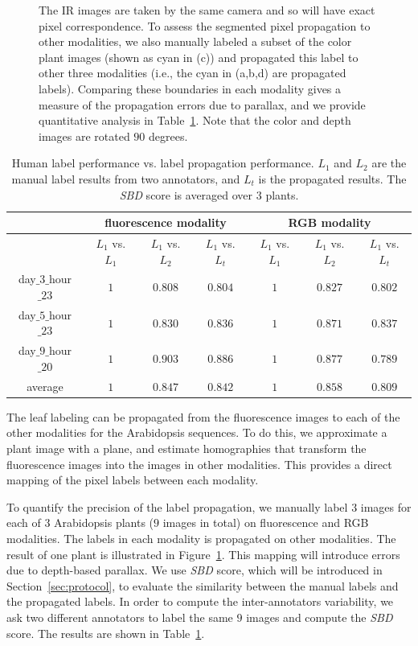 \begin{figure}[t]
\begin{centering}
{The IR images are taken by the same camera and so will have exact pixel correspondence.
To assess the segmented pixel propagation to other modalities, we also manually labeled a subset of the color plant images (shown as cyan in (c)) and propagated this label to other three modalities (i.e., the cyan in (a,b,d) are propagated labels).
Comparing these boundaries in each modality gives a measure of the propagation errors due to parallax, and we provide quantitative analysis in Table~\ref{tab:labelError}.
Note that the color and depth images are rotated $90$ degrees.}
\label{fig:LabelAlignment}
\end{centering}
\end{figure}


\begin{table}[t]
\centering
\caption{Human label performance vs. label propagation performance.
$L_1$ and $L_2$ are the manual label results from two annotators, and $L_t$ is the propagated results.
The {\it{SBD}} score is averaged over $3$ plants.}
\begin{tabular}{c|c|c|c|c|c|c}
\hline
    & \multicolumn{3}{c|}{fluorescence modality} & \multicolumn{3}{c}{RGB modality}\\ \hline
    & $L_1$ vs. $L_1$ & $L_1$ vs. $L_2$  & $L_1$ vs. $L_t$ & $L_1$ vs. $L_1$ & $L_1$ vs. $L_2$ & $L_1$ vs. $L_t$ \\ \hline
   day$\_3\_$hour$\_23$ & $1$ & $0.808$ & $0.804$ & $1$ & $0.827$ & $0.802$ \\ \hline
   day$\_5\_$hour$\_23$ & $1$ & $0.830$ & $0.836$ & $1$ & $0.871$ & $0.837$ \\ \hline
   day$\_9\_$hour$\_20$ & $1$ & $0.903$ & $0.886$ & $1$ & $0.877$ & $0.789$ \\ \hline
                   average &          $1$ & $0.847$ & $0.842$ & $1$ & $0.858$ & $0.809$ \\ \hline
\end{tabular}
\label{tab:labelError}
\end{table}

The leaf labeling can be propagated from the fluorescence images to each of the other modalities for the Arabidopsis sequences.
To do this, we approximate a plant image with a plane, and estimate homographies that transform the fluorescence images into the images in other modalities.
This provides a direct mapping of the pixel labels between each modality.

To quantify the precision of the label propagation, we manually label $3$ images for each of $3$ Arabidopsis plants ($9$ images in total) on fluorescence and RGB modalities.
The labels in each modality is propagated on other modalities.
The result of one plant is illustrated in Figure~\ref{fig:LabelAlignment}.
This mapping will introduce errors due to depth-based parallax.
We use {\it{SBD}} score, which will be introduced in Section~\ref{sec:protocol}, to evaluate the similarity between the manual labels and the propagated labels.
In order to compute the inter-annotators variability, we ask two different annotators to label the same $9$ images and compute the {\it{SBD}} score.
The results are shown in Table~\ref{tab:labelError}.

